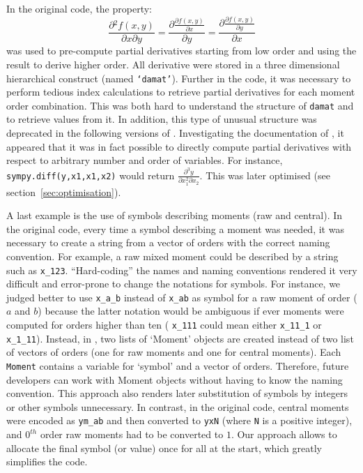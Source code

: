 In the original code, the property:
\begin{equation}
\label{eq:partial}
\frac{\partial{} ^ 2 f(x,y)}{\partial x \partial y} =
\frac{\partial{} \frac{\partial{} f(x,y)}{\partial x}}{\partial y} =
\frac{\partial{} \frac{\partial{} f(x,y)}{\partial{} y}}{\partial{} x}
\end{equation}
was used to pre-compute partial derivatives starting from low order and using the result to derive higher order.
All derivative were stored in a three dimensional hierarchical construct (named \texttt{`damat'}).
Further in the code, it was necessary to perform  tedious index calculations to
retrieve partial derivatives for each moment order combination.
This was both hard to understand the structure of \texttt{damat} and to retrieve values from it.
In addition, this type of unusual structure was deprecated in the following versions of \sympy{}.
Investigating the documentation of \sympy, it appeared that it was in fact possible to directly compute partial derivatives
with respect to arbitrary number and order of variables.
For instance, \texttt{sympy.diff(y,x1,x1,x2)} would return $\frac{\partial^3 y}{\partial x_1^2 \partial x_2}$.
This was later optimised (see section~\ref{sec:optimisation}).

A last example is the use of symbols describing moments (raw and central). In the original code,
every time a symbol describing a moment was needed, it was necessary to create a string from a vector of orders with the correct naming convention.
For example, a raw mixed moment could be described by a string such as \verb"x_123".
``Hard-coding'' the names and naming conventions rendered it very difficult and error-prone to change the notations for symbols.
For instance, we judged better to use \verb"x_a_b" instead of \verb"x_ab" as symbol for a raw moment of order ($a$ and $b$)
because the latter notation would be ambiguous if ever moments were computed for orders higher than ten (\eg{} \verb"x_111" could mean either \verb"x_11_1"  or \verb"x_1_11").
Instead, in \means, two lists of `Moment' objects are created instead of two list of vectors of orders (one for raw moments and one for central moments).
Each \texttt{Moment} contains a variable for `symbol' and a vector of orders.
Therefore, future developers can work with Moment objects without having to know the naming convention.
This approach also renders later substitution of symbols by integers or other symbols unnecessary.
In contrast, in the original code, central moments were encoded as \verb"ym_ab" and then
converted to \verb"yxN" (where \verb"N"  is a positive integer),
and $0^{th}$ order raw moments had to be converted to $1$.
Our approach allows to allocate the final symbol (or value) once for all at the start, which greatly simplifies the code.

